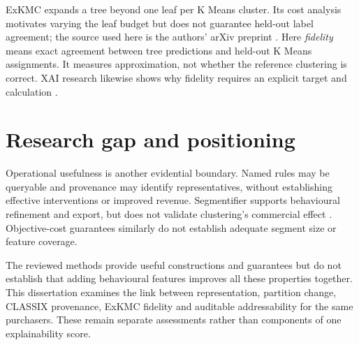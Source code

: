 ExKMC expands a tree beyond one leaf per K Means cluster. Its cost analysis motivates varying the leaf budget but does not guarantee held-out label agreement; the source used here is the authors' arXiv preprint \citep{frost2020exkmc}. Here \emph{fidelity} means exact agreement between tree predictions and held-out K Means assignments. It measures approximation, not whether the reference clustering is correct. XAI research likewise shows why fidelity requires an explicit target and calculation \citep{mironicolau2025fidelity}.

\section{Research gap and positioning}

Operational usefulness is another evidential boundary. Named rules may be queryable and provenance may identify representatives, without establishing effective interventions or improved revenue. Segmentifier supports behavioural refinement and export, but does not validate clustering's commercial effect \citep{dextras2019segmentifier}. Objective-cost guarantees similarly do not establish adequate segment size or feature coverage.

The reviewed methods provide useful constructions and guarantees but do not establish that adding behavioural features improves all these properties together. This dissertation examines the link between representation, partition change, CLASSIX provenance, ExKMC fidelity and auditable addressability for the same purchasers. These remain separate assessments rather than components of one explainability score.

